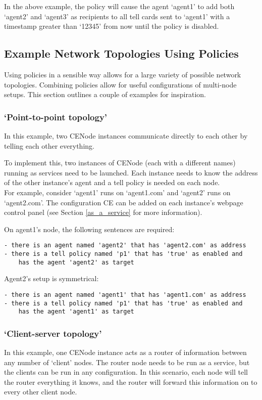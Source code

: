 \documentclass{scrartcl}
\begin{document}
In the above example, the policy will cause the agent `agent1' to add both `agent2' and `agent3' as recipients to all tell cards sent to `agent1' with a timestamp greater than `12345' from now until the policy is disabled.

\subsection{Example Network Topologies Using Policies}
Using policies in a sensible way allows for a large variety of possible network topologies. Combining policies allow for useful configurations of multi-node setups. This section outlines a couple of examples for inspiration.

\subsubsection{`Point-to-point topology'}
In this example, two CENode instances communicate directly to each other by telling each other everything.

To implement this, two instances of CENode (each with a different names) running as services need to be launched. Each instance needs to know the address of the other instance's agent and a tell policy is needed on each node.\\

For example, consider `agent1' runs on `agent1.com' and `agent2' runs on `agent2.com'. The configuration CE can be added on each instance's webpage control panel (see Section \ref{as_a_service} for more information).

On agent1's node, the following sentences are required:\\
\begin{verbatim}
- there is an agent named 'agent2' that has 'agent2.com' as address
- there is a tell policy named 'p1' that has 'true' as enabled and 
    has the agent 'agent2' as target
\end{verbatim}

Agent2's setup is symmetrical:\\
\begin{verbatim}
- there is an agent named 'agent1' that has 'agent1.com' as address
- there is a tell policy named 'p1' that has 'true' as enabled and 
    has the agent 'agent1' as target
\end{verbatim}


\subsubsection{`Client-server topology'}
In this example, one CENode instance acts as a router of information between any number of `client' nodes. The router node needs to be run as a service, but the clients can be run in any configuration. In this scenario, each node will tell the router everything it knows, and the router will forward this information on to every other client node.\\
\end{document}
